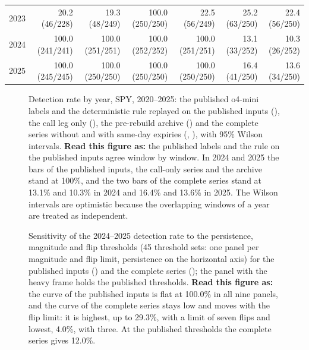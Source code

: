\begin{table}[H]
\begin{tabular}{@{}lrrrrrr@{}}
2023 & 20.2 (46/228) & 19.3 (48/249) & 100.0 (250/250) & 22.5 (56/249) & 25.2 (63/250) & 22.4 (56/250) \\
2024 & 100.0 (241/241) & 100.0 (251/251) & 100.0 (252/252) & 100.0 (251/251) & 13.1 (33/252) & 10.3 (26/252) \\
2025 & 100.0 (245/245) & 100.0 (250/250) & 100.0 (250/250) & 100.0 (250/250) & 16.4 (41/250) & 13.6 (34/250) \\
\bottomrule
\end{tabular}
\end{table}

\begin{figure}[H]
\centering
\resultfigure{\figReplay}
\caption{Detection rate by year, SPY, 2020--2025: the published o4-mini labels and the deterministic rule replayed on the published inputs (), the call leg only (), the pre-rebuild archive () and the complete series without and with same-day expiries (, ), with 95\% Wilson intervals. \textbf{Read this figure as:} the published labels and the rule on the published inputs agree window by window. In 2024 and 2025 the bars of the published inputs, the call-only series and the archive stand at 100\%, and the two bars of the complete series stand at 13.1\% and 10.3\% in 2024 and 16.4\% and 13.6\% in 2025. The Wilson intervals are optimistic because the overlapping windows of a year are treated as independent.}
\label{fig:replay}
\end{figure}

\begin{figure}[H]
\centering
\resultfigure{\figThresholds}
\caption{Sensitivity of the 2024--2025 detection rate to the persistence, magnitude and flip thresholds (45 threshold sets: one panel per magnitude and flip limit, persistence on the horizontal axis) for the published inputs () and the complete series (); the panel with the heavy frame holds the published thresholds. \textbf{Read this figure as:} the curve of the published inputs is flat at 100.0\% in all nine panels, and the curve of the complete series stays low and moves with the flip limit: it is highest, up to 29.3\%, with a limit of seven flips and lowest, 4.0\%, with three. At the published thresholds the complete series gives 12.0\%.}
\label{fig:thresholds}
\end{figure}

